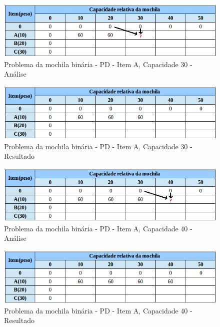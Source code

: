 \FloatBarrier
\begin{figure}[!h]
\centering
\includegraphics[keepaspectratio=true,scale=0.6]{figuras/matriz10_30.png}
\caption{Problema da mochila binária - PD - Item A, Capacidade 30 - Análise}
\label{matriz10_30}
\end{figure}

\FloatBarrier
\begin{figure}[!h]
\centering
\includegraphics[keepaspectratio=true,scale=0.6]{figuras/matriz10_30_resp.png}
\caption{Problema da mochila binária - PD - Item A, Capacidade 30 - Resultado}
\label{matriz10_30_resp}
\end{figure} 

\FloatBarrier
\begin{figure}[!h]
\centering
\includegraphics[keepaspectratio=true,scale=0.6]{figuras/matriz10_40.png}
\caption{Problema da mochila binária - PD - Item A, Capacidade 40 - Análise}
\label{matriz10_40}
\end{figure}

\FloatBarrier
\begin{figure}[!h]
\centering
\includegraphics[keepaspectratio=true,scale=0.6]{figuras/matriz10_40_resp.png}
\caption{Problema da mochila binária - PD - Item A, Capacidade 40 - Resultado}
\label{matriz10_40_resp}
\end{figure}

